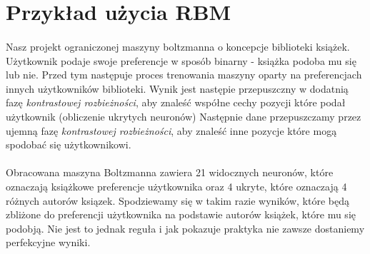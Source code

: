 \section{Przykład użycia RBM}
    \paragraph{}
	Nasz projekt ograniczonej maszyny boltzmanna o koncepcje biblioteki książek. 
	Użytkownik podaje swoje preferencje w sposób binarny - książka podoba mu się lub nie. 
	Przed tym następuje proces trenowania maszyny oparty na preferencjach innych użytkowników biblioteki. 
	Wynik jest następie przepuszczny w dodatnią fazę \textit{kontrastowej rozbieżności},
	aby znaleść współne cechy pozycji które podał użytkownik (obliczenie ukrytych neuronów)
	Następnie dane przepuszczamy przez ujemną fazę \textit{kontrastowej rozbieżności}, 
	aby znaleść inne pozycje które mogą spodobać się użytkownikowi.
    \paragraph{}
	Obracowana maszyna Boltzmanna zawiera 21 widocznych neuronów, które oznaczają książkowe preferencje użytkownika oraz 4 ukryte, które oznaczają  4 			różnych autorów ksiązek. Spodziewamy się w takim razie wyników, które będą zbliżone do preferencji użytkownika na podstawie autorów książek, które mu się 		podobją. Nie jest to jednak reguła i jak pokazuje praktyka nie zawsze dostaniemy perfekcyjne wyniki.